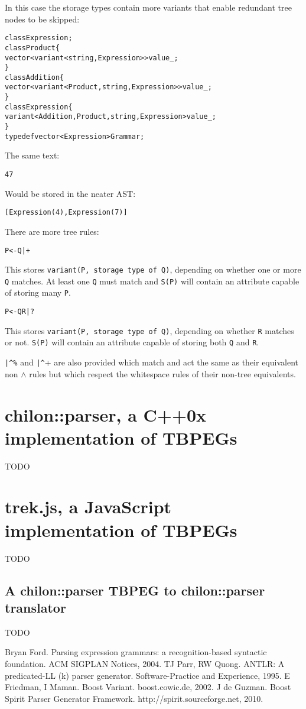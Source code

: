 \documentclass[a4paper,11pt]{article}
\begin{document}
In this case the storage types contain more variants that enable redundant tree nodes to be skipped:
\begin{alltt}
    class Expression;
    class Product \{
        vector< variant<string, Expression> > value\_;
    \}
    class Addition \{
        vector< variant<Product, string, Expression> > value\_;
    \}
    class Expression \{
        variant<Addition, Product, string, Expression> value\_;
    \}
    typedef vector<Expression> Grammar;
\end{alltt}

The same text:
\begin{alltt}
    4 7
\end{alltt}

Would be stored in the neater AST:
\begin{alltt}
    [ Expression(4), Expression(7) ]
\end{alltt}

There are more tree rules:
\begin{alltt}
    P <- Q|+
\end{alltt}

This stores \verb+variant(P, storage type of Q)+, depending on whether one or more \verb+Q+ matches.
At least one \verb+Q+ must match and \verb+S(P)+ will contain an attribute capable of storing many \verb+P+.

\begin{alltt}
    P <- Q R|?
\end{alltt}

This stores \verb+variant(P, storage type of Q)+, depending on whether \verb+R+ matches or not.
\verb+S(P)+ will contain an attribute capable of storing both \verb+Q+ and \verb+R+.

\verb+|^%+ and \verb+|^++ are also provided which match and act the same as their equivalent non $\wedge$ rules but which respect the whitespace rules of their non-tree equivalents.

\section{chilon::parser, a C++0x implementation of TBPEGs}
TODO

\section{trek.js, a JavaScript implementation of TBPEGs}
TODO

\subsection{A chilon::parser TBPEG to chilon::parser translator}
TODO

\begin{thebibliography}{9}
 Bryan Ford. Parsing expression grammars: a recognition-based syntactic foundation. ACM SIGPLAN Notices, 2004.
 TJ Parr, RW Quong. ANTLR: A predicated-LL (k) parser generator. Software-Practice and Experience, 1995.
 E Friedman, I Maman. Boost Variant. boost.cowic.de, 2002.
 J de Guzman. Boost Spirit Parser Generator Framework. http://spirit.sourceforge.net, 2010.
\end{thebibliography}
\end{document}
